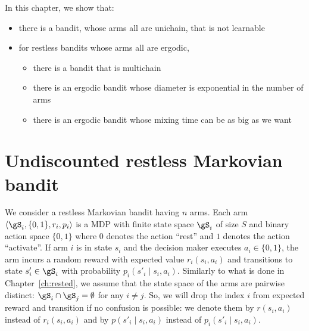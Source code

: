 

In this chapter, we show that:
\begin{itemize}
    \item there is a bandit, whose arms all are unichain, that is not learnable
    \item for restless bandits whose arms all are ergodic,
        \begin{itemize}
            \item there is a bandit that is multichain
            \item there is an ergodic bandit whose diameter is exponential in the number of arms
            \item there is an ergodic bandit whose mixing time can be as big as we want
        \end{itemize}
\end{itemize}



\section{Undiscounted restless Markovian bandit}
\label{ch:restless:sec:restless}

We consider a restless Markovian bandit having $n$ arms.
Each arm $\langle\gS_i, \{0,1\}, r_i, p_i\rangle$ is a MDP with finite state space $\gS_i$ of size $S$ and binary action space $\{0,1\}$ where $0$ denotes the action ``rest'' and $1$ denotes the action ``activate''.
If arm $i$ is in state $s_i$ and the decision maker executes $a_i\in\{0,1\}$, the arm incurs a random reward with expected value $r_i(s_i,a_i)$ and transitions to state $s'_i\in\gS_i$ with probability $p_i(s'_i\mid s_i,a_i)$.
Similarly to what is done in Chapter~\ref{ch:rested}, we assume that the state space of the arms are pairwise distinct: $\gS_i\cap\gS_j=\emptyset$ for any $i\neq j$.
So, we will drop the index $i$ from expected reward and transition if no confusion is possible: we denote them by $r(s_i,a_i)$ instead of $r_i(s_i,a_i)$ and by $p(s'_i\mid s_i,a_i)$ instead of $p_i(s'_i\mid s_i,a_i)$.

